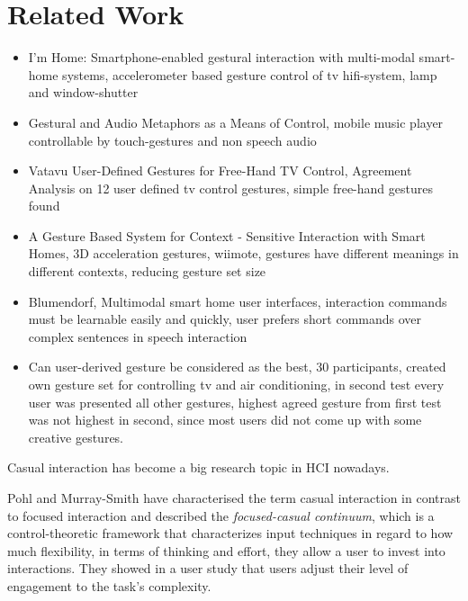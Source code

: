 \chapter{Related Work}\label{ch:relatedwork}

\begin{itemize}

\item{
	I'm Home: Smartphone-enabled gestural interaction with multi-modal smart-home systems,
	accelerometer based gesture control of tv hifi-system, lamp and window-shutter
}
\item{
	Gestural and Audio Metaphors as a Means of Control,
	mobile music player controllable by touch-gestures and non speech audio
}
\item{
	Vatavu User-Defined Gestures for Free-Hand TV Control,
	Agreement Analysis on 12 user defined tv control gestures,
	simple free-hand gestures found
}
\item{
	A Gesture Based System for Context - Sensitive Interaction with Smart Homes,
	3D acceleration gestures, wiimote, gestures have different meanings in different contexts, reducing gesture set size
}
\item{
	Blumendorf, Multimodal smart home user interfaces,
	interaction commands must be learnable easily and quickly, user prefers short commands over complex sentences in speech interaction
}
\item{
	Can user-derived gesture be considered as the best,
	30 participants, created own gesture set for controlling tv and air conditioning, in second test every user was presented all other gestures, highest agreed gesture from first test was not highest in second, since most users did not come up with some creative gestures.
}

\end{itemize}

Casual interaction has become a big research topic in \ac{HCI} nowadays.

Pohl and Murray-Smith \cite{pohl2013focused} have characterised the term casual interaction in contrast to focused interaction and described the \textit{focused-casual continuum}, which is a control-theoretic framework that characterizes input techniques in regard to how much flexibility, in terms of thinking and effort, they allow a user to invest into interactions. They showed in a user study that users adjust their level of engagement to the task's complexity.

